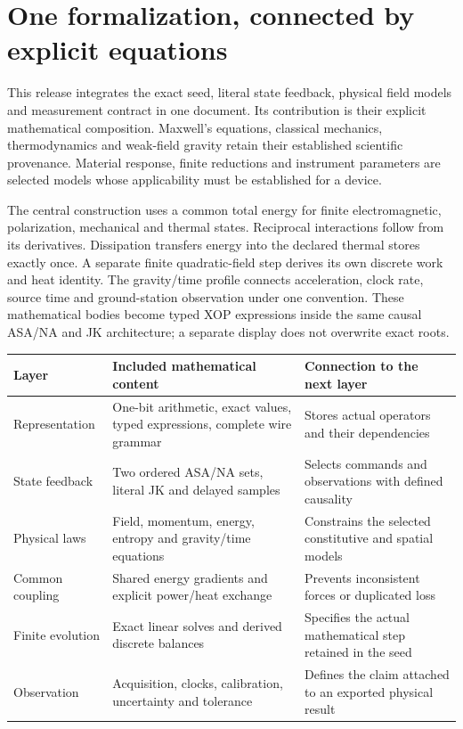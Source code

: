 \section*{One formalization, connected by explicit equations}
This release integrates the exact seed, literal state feedback, physical field
models and measurement contract in one document. Its contribution is their
explicit mathematical composition. Maxwell's equations, classical mechanics,
thermodynamics and weak-field gravity retain their established scientific
provenance. Material response, finite reductions and instrument parameters
are selected models whose applicability must be established for a device.

The central construction uses a common total energy for finite electromagnetic,
polarization, mechanical and thermal states. Reciprocal interactions follow
from its derivatives. Dissipation transfers energy into the declared thermal
stores exactly once. A separate finite quadratic-field step derives its own
discrete work and heat identity. The gravity/time profile connects acceleration,
clock rate, source time and ground-station observation under one convention.
These mathematical bodies become typed XOP expressions inside the same causal
ASA/NA and JK architecture; a separate display does not overwrite exact roots.

\begin{center}\small
\begin{tabularx}{\linewidth}{@{}P{31mm}Y Y@{}}
\toprule Layer & Included mathematical content & Connection to the next layer\\\midrule
Representation & One-bit arithmetic, exact values, typed expressions, complete wire grammar & Stores actual operators and their dependencies\\
State feedback & Two ordered ASA/NA sets, literal JK and delayed samples & Selects commands and observations with defined causality\\
Physical laws & Field, momentum, energy, entropy and gravity/time equations & Constrains the selected constitutive and spatial models\\
Common coupling & Shared energy gradients and explicit power/heat exchange & Prevents inconsistent forces or duplicated loss\\
Finite evolution & Exact linear solves and derived discrete balances & Specifies the actual mathematical step retained in the seed\\
Observation & Acquisition, clocks, calibration, uncertainty and tolerance & Defines the claim attached to an exported physical result\\
\bottomrule
\end{tabularx}\end{center}

